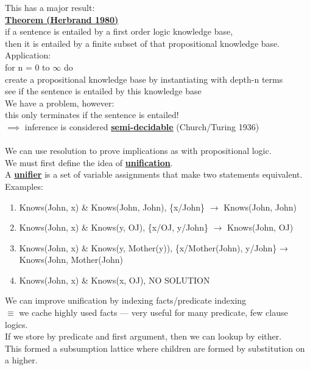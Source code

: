 \documentclass[../../lecture_notes.tex]{subfiles}
\begin{document}
\noindent This has a major result:\\
	\indent \textbf{\underline{Theorem (Herbrand 1980)}}\\
        \indent \indent if a sentence is entailed by a first order logic knowledge base,\\
        \indent \indent then it is entailed by a finite subset of that propositional knowledge base.\\
Application:\\
	\indent for n = 0 to $\infty$ do\\
	\indent \indent create a propositional knowledge base by instantiating with depth-n terms\\
	\indent \indent see if the sentence is entailed by this knowledge base\\
We have a problem, however:\\
	\indent this only terminates if the sentence is entailed!\\
	\indent $\implies$ inference is considered \textbf{\underline{semi-decidable}} (Church/Turing 1936)\\
\\
We can use resolution to prove implications as with propositional logic.\\
We must first define the idea of \textbf{\underline{unification}}.\\
A \textbf{\underline{unifier}} is a set of variable assignments that make two statements equivalent.\\
	\indent Examples:
		\begin{enumerate} [itemsep=0mm]
			\item Knows(John, x) \& Knows(John, John), \{x/John\} $\rightarrow$ Knows(John, John)
			\item Knows(John, x) \& Knows(y, OJ), \{x/OJ, y/John\} $\rightarrow$ Knows(John, OJ)
			\item Knows(John, x) \& Knows(y, Mother(y)), \{x/Mother(John), y/John\} 
				→ Knows(John, Mother(John)
			\item Knows(John, x) \& Knows(x, OJ), NO SOLUTION
		\end{enumerate}
We can improve unification by indexing facts/predicate indexing\\
	\indent $\equiv$ we cache highly used facts — very useful for many predicate, few clause logics.\\
If we store by predicate and first argument, then we can lookup by either.\\
This formed a subsumption lattice where children are formed by substitution on a higher.\\
\end{document}
